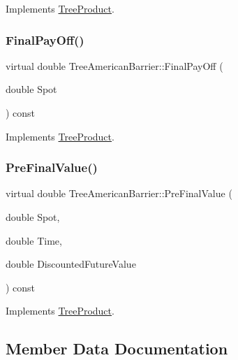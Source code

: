 Implements \hyperlink{classTreeProduct_a38edda2bee3c7203e94511df96a18c32}{Tree\+Product}.

\hypertarget{classTreeAmericanBarrier_a55218e00428e49c18186358ae1b54b58}{}\label{classTreeAmericanBarrier_a55218e00428e49c18186358ae1b54b58} 
\subsubsection{\texorpdfstring{Final\+Pay\+Off()}{FinalPayOff()}}
{\footnotesize\ttfamily virtual double Tree\+American\+Barrier\+::\+Final\+Pay\+Off (\begin{DoxyParamCaption}\item[{double}]{Spot }\end{DoxyParamCaption}) const\hspace{0.3cm}{\ttfamily [virtual]}}



Implements \hyperlink{classTreeProduct_acda7abc61cf6ac1b0f69a09eb0709832}{Tree\+Product}.

\hypertarget{classTreeAmericanBarrier_a66ac7ef18f10dbc5232b7c18e3093805}{}\label{classTreeAmericanBarrier_a66ac7ef18f10dbc5232b7c18e3093805} 
\subsubsection{\texorpdfstring{Pre\+Final\+Value()}{PreFinalValue()}}
{\footnotesize\ttfamily virtual double Tree\+American\+Barrier\+::\+Pre\+Final\+Value (\begin{DoxyParamCaption}\item[{double}]{Spot,  }\item[{double}]{Time,  }\item[{double}]{Discounted\+Future\+Value }\end{DoxyParamCaption}) const\hspace{0.3cm}{\ttfamily [virtual]}}



Implements \hyperlink{classTreeProduct_a0b58b8acdd3759f55212c1c65361056e}{Tree\+Product}.



\subsection{Member Data Documentation}
\hypertarget{classTreeAmericanBarrier_a30b4998595cdd89426043fc11522f325}{}\label{classTreeAmericanBarrier_a30b4998595cdd89426043fc11522f325} 
